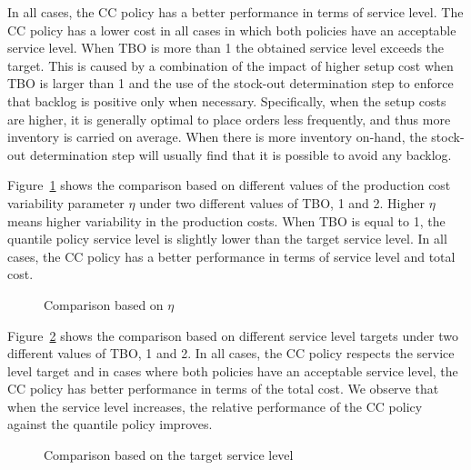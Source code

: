 \documentclass[msom]{oo}
\begin{document}
In all cases, the CC policy has a better performance in terms of service level. The CC policy has a lower cost in all cases in which both policies have an acceptable service level. When TBO is more than 1 the obtained service level exceeds the target.  This is caused by a combination of the impact of higher setup cost when TBO is larger than 1 and the use of the stock-out determination step to enforce that backlog is positive only when necessary. Specifically, when the setup costs are higher, it is generally optimal to place orders less frequently, and thus more inventory is carried on average. When there is more inventory on-hand, the stock-out determination step will usually find that it is possible to avoid any backlog. %

Figure~\ref{fig:ETAComp} shows the comparison based on different values of the production cost variability parameter $\eta$ under two different values of TBO, 1 and 2.  Higher $\eta$ means higher variability in the production costs.  When TBO is equal to 1, the quantile policy service level is slightly lower than the target service level. In all cases, the CC policy has a better performance in terms of service level and total cost. 

\begin{figure}[htbp]%
    \centering
    \caption{Comparison based on $\eta$}%
    \label{fig:ETAComp}%
\end{figure}

Figure~\ref{fig:SLComp} shows the comparison based on different service level targets under two different values of TBO, 1 and 2. In all cases, the CC policy respects the service level target and in cases where both policies have an acceptable service level, the CC policy has better performance in terms of the total cost. We observe that when the service level increases, the relative performance of the CC policy against the quantile policy improves. 
\begin{figure}[htbp]
    \centering
    \caption{Comparison based on the target service level}%
    \label{fig:SLComp}%
\end{figure}
\end{document}
